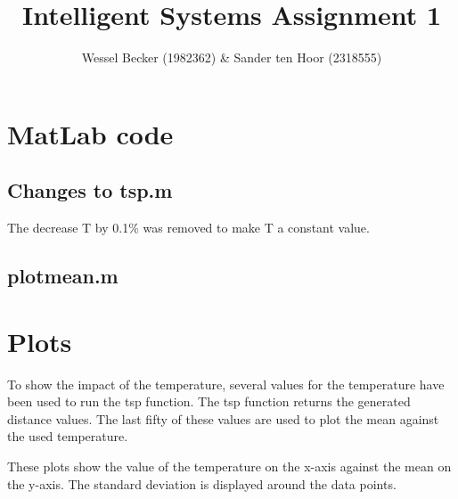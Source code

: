 \documentclass[10pt,a4paper]{article}
\begin{document}
\title{Intelligent Systems Assignment 1}
\author{Wessel Becker (1982362) \& Sander ten Hoor (2318555)}
\maketitle
\section{MatLab code}
\subsection{Changes to tsp.m}
The decrease T by 0.1\% was removed to make T a constant value.


\subsection{plotmean.m}


\section{Plots}
To show the impact of the temperature, several values for the temperature have been used to run the tsp function. The tsp function returns the generated distance values. The last fifty of these values are used to plot the mean against the used temperature.

These plots show the value of the temperature on the x-axis against the mean on the y-axis. The standard deviation is displayed around the data points.

 \\
\end{document}
